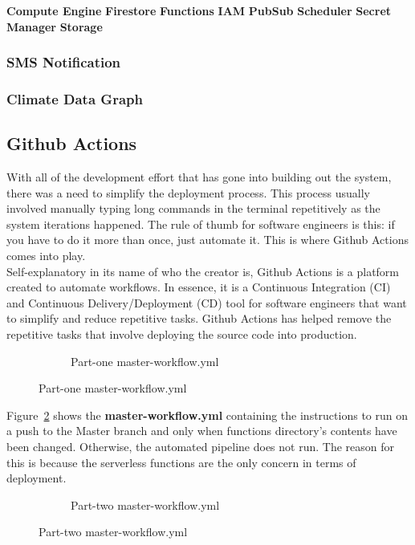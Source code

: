 \documentclass{article}
\begin{document}
\textbf{Compute Engine}
\textbf{Firestore}
\textbf{Functions}
\textbf{IAM}
\textbf{PubSub}
\textbf{Scheduler}
\textbf{Secret Manager}
\textbf{Storage}

\subsubsection{SMS Notification}

\subsubsection{Climate Data Graph}

\subsection{Github Actions}
With all of the development effort that has gone into building out the system, there was a need to simplify the deployment process. This process usually involved manually typing long commands in the terminal repetitively as the system iterations happened. The rule of thumb for software engineers is this: if you have to do it more than once, just automate it. This is where Github Actions comes into play.\\

Self-explanatory in its name of who the creator is, Github Actions is a platform created to automate workflows. In essence, it is a Continuous Integration (CI) and Continuous Delivery/Deployment (CD) tool for software engineers that want to simplify and reduce repetitive tasks. Github Actions has helped remove the repetitive tasks that involve deploying the source code into production.

\begin{figure}[H]
	\begin{figure}[H]
		
		\caption{Part-one master-workflow.yml}
		\label{fig:workflow-file-one}
	\end{figure}
\end{figure}

Figure~\ref{fig:workflow-file-one} shows the \textbf{master-workflow.yml} containing the instructions to run on a push to the Master branch and only when functions directory's contents have been changed. Otherwise, the automated pipeline does not run. The reason for this is because the serverless functions are the only concern in terms of deployment.

\begin{figure}[H]
	\begin{figure}[H]
		
		\caption{Part-two master-workflow.yml}
		\label{fig:workflow-file-two}
	\end{figure}
\end{figure}
\end{document}
